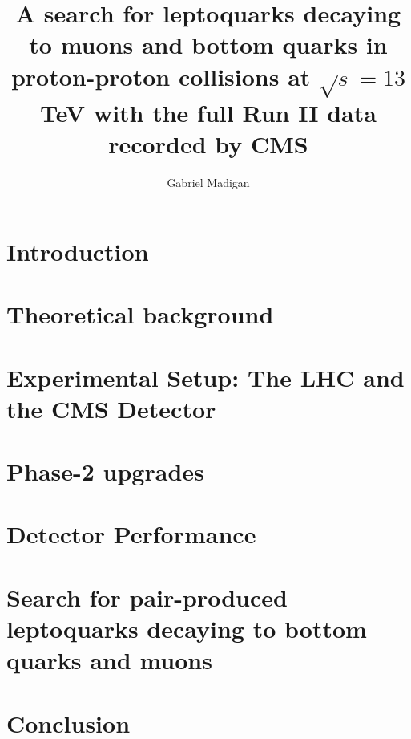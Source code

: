 \documentclass[thesis]{neu}
\title{
A search for leptoquarks decaying to muons and bottom quarks in proton-proton collisions at \texorpdfstring{$\sqrt{s}=13$}{center-of-mass energies = 13} TeV with the full Run II data recorded by CMS 
}
\author{Gabriel Madigan}
\begin{document}
\newpage 

 


\chapter{Introduction} \label{chapter:Introduction}


\chapter{Theoretical background} \label{chapter:Theory}


\chapter{Experimental Setup: The LHC and the CMS Detector} \label{chapter:Experiment}


\chapter{Phase-2 upgrades} \label{chapter:Phase2Upgrades}


\chapter{Detector Performance} \label{chapter:DetectorPerformance}


\chapter{Search for pair-produced leptoquarks decaying to bottom quarks and muons} \label{chapter:LeptoquarkSearch}
   

\chapter{Conclusion} \label{chapter:Conclusion} 

\end{document}
